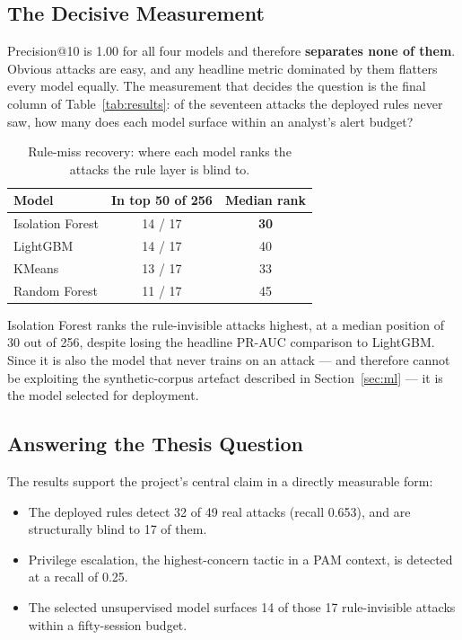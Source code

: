 \documentclass{classeENS}
\begin{document}
\subsection{The Decisive Measurement}
Precision@10 is 1.00 for all four models and therefore \textbf{separates none of them}. Obvious attacks are easy, and any headline metric dominated by them flatters every model equally. The measurement that decides the question is the final column of Table~\ref{tab:results}: of the seventeen attacks the deployed rules never saw, how many does each model surface within an analyst's alert budget?

\begin{table}[H]
\centering
\begin{tabular}{|l|c|c|}
\hline
\textbf{Model} & \textbf{In top 50 of 256} & \textbf{Median rank} \\
\hline
Isolation Forest & 14 / 17 & \textbf{30} \\
LightGBM & 14 / 17 & 40 \\
KMeans & 13 / 17 & 33 \\
Random Forest & 11 / 17 & 45 \\
\hline
\end{tabular}
\caption{Rule-miss recovery: where each model ranks the attacks the rule layer is blind to.}
\label{tab:recovery}
\end{table}

Isolation Forest ranks the rule-invisible attacks highest, at a median position of 30 out of 256, despite losing the headline PR-AUC comparison to LightGBM. Since it is also the model that never trains on an attack --- and therefore cannot be exploiting the synthetic-corpus artefact described in Section~\ref{sec:ml} --- it is the model selected for deployment.

\subsection{Answering the Thesis Question}
The results support the project's central claim in a directly measurable form:

\begin{itemize}
    \item The deployed rules detect 32 of 49 real attacks (recall 0.653), and are structurally blind to 17 of them.
    \item Privilege escalation, the highest-concern tactic in a PAM context, is detected at a recall of 0.25.
    \item The selected unsupervised model surfaces 14 of those 17 rule-invisible attacks within a fifty-session budget.
\end{itemize}
\end{document}
